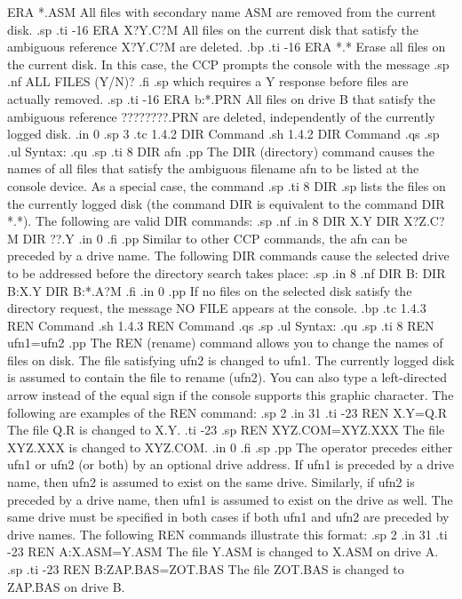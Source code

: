 ERA *.ASM       All files with secondary name ASM are removed from the
current disk.
.sp
.ti -16
ERA X?Y.C?M     All files on the current disk that satisfy the ambiguous
reference X?Y.C?M are deleted.
.bp
.ti -16
ERA *.*         Erase all files on the current disk.  In this 
case, the CCP prompts the console with the message
.sp
.nf
ALL FILES (Y/N)?
.fi
.sp
which requires a Y response before files are actually removed.
.sp
.ti -16
ERA b:*.PRN     All files on drive B that satisfy the ambiguous
reference ????????.PRN are deleted, independently of the currently
logged disk.
.in 0
.sp 3
.tc         1.4.2  DIR Command
.sh
1.4.2  DIR Command
.qs
.sp
.ul
Syntax:
.qu
.sp
.ti 8
DIR afn
.pp
The DIR (directory) command causes the names of all files that satisfy the
ambiguous filename afn to be listed at the console device.  As a special
case, the command
.sp
.ti 8
DIR
.sp
lists the files on the currently logged disk (the command DIR is
equivalent to the command DIR *.*).  The following are valid DIR 
commands:
.sp
.nf
.in 8
DIR X.Y
DIR X?Z.C?M
DIR ??.Y
.in 0
.fi
.pp
Similar to other CCP commands, the afn can be preceded by a drive name.
The following DIR commands cause the selected drive to be addressed before
the directory search takes place:
.sp
.in 8
.nf
DIR B:
DIR B:X.Y
DIR B:*.A?M
.fi
.in 0
.pp
If no files on the selected disk satisfy the directory request, the
message NO FILE appears at the console.
.bp
.tc         1.4.3  REN Command
.sh
1.4.3  REN Command
.qs
.sp
.ul
Syntax:
.qu
.sp
.ti 8
REN ufn1=ufn2
.pp
The REN (rename) command allows you to change the names of files on
disk.  The file satisfying ufn2 is changed to ufn1.  The currently logged
disk is assumed to contain the file to rename (ufn2).  You can also
type a left-directed arrow instead of the equal sign if the console supports
this graphic character.  The following are examples of the REN 
command:
.sp 2
.in 31
.ti -23
REN X.Y=Q.R            The file Q.R is changed to X.Y.
.ti -23
.sp
REN XYZ.COM=XYZ.XXX    The file XYZ.XXX is changed to XYZ.COM.
.in 0
.fi
.sp
.pp
The operator precedes either ufn1 or ufn2 (or both) by an optional drive
address.  If ufn1 is preceded by a drive name, then ufn2 is assumed to exist
on the same drive.  Similarly, if ufn2 is preceded by a drive name, then
ufn1 is assumed to exist on the drive as well.  The same drive must be
specified in both cases if both ufn1 and ufn2 are preceded by drive names.
The following REN commands illustrate this format:
.sp 2
.in 31
.ti -23
REN A:X.ASM=Y.ASM      The file Y.ASM is changed to X.ASM on drive A.
.sp
.ti -23
REN B:ZAP.BAS=ZOT.BAS  The file ZOT.BAS is changed to ZAP.BAS on drive B.
